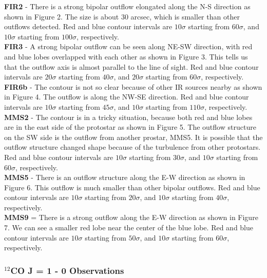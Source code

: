 \documentclass[twoside,11pt]{gshs_thesis}
\begin{document}
\noindent\textbf{FIR2} - There is a strong bipolar outflow elongated along the N-S direction as shown in Figure 2. The size is about 30 arcsec, which is smaller than other outflows detected. Red and blue contour intervals are $10\sigma$ starting from $60\sigma$, and $10\sigma$ starting from $100\sigma$, respectively.\\
\textbf{FIR3} - A strong bipolar outflow can be seen along NE-SW direction, with red and blue lobes overlapped with each other as shown in Figure 3. This tells us that the outflow axis is almost parallel to the line of sight. Red and blue contour intervals are $20\sigma$ starting from $40\sigma$, and $20\sigma$ starting from $60\sigma$, respectively. \\
\textbf{FIR6b} - The contour is not so clear because of other IR sources nearby as shown in Figure 4. The outflow is along the NW-SE direction. Red and blue contour intervals are $10\sigma$ starting from $45\sigma$, and $10\sigma$ starting from $110\sigma$, respectively.\\
\textbf{MMS2} - The contour is in a tricky situation, because both red and blue lobes are in the east side of the protostar as shown in Figure 5. The outflow structure on the SW side is the outflow from another prostar, MMS5. It is possible that the outflow structure changed shape because of the turbulence from other protostars. Red and blue contour intervals are $10\sigma$ starting from $30\sigma$, and $10\sigma$ starting from $60\sigma$, respectively.\\
\textbf{MMS5} - There is an outflow structure along the E-W direction as shown in Figure 6. This outflow is much smaller than other bipolar outflows. Red and blue contour intervals are $10\sigma$ starting from $20\sigma$, and $10\sigma$ starting from $40\sigma$, respectively.\\
\textbf{MMS9} = There is a strong outflow along the E-W direction as shown in Figure 7. We can see a smaller red lobe near the center of the blue lobe. Red and blue contour intervals are $10\sigma$ starting from $50\sigma$, and $10\sigma$ starting from $60\sigma$, respectively.\\

\subsubsection{$^{12}$CO J = 1 - 0 Observations}
\end{document}
